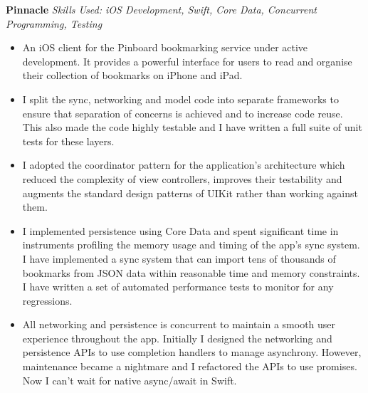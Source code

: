 \textbf{Pinnacle}  \newline
\textit{Skills Used: iOS Development, Swift, Core Data, Concurrent Programming, Testing}
%
\begin{itemize}[leftmargin=0mm]
\item An iOS client for the Pinboard bookmarking service under active
  development. It provides a powerful interface for users to read and organise
  their collection of bookmarks on iPhone and iPad.
\item I split the sync, networking and model code into separate frameworks to
  ensure that separation of concerns is achieved and to increase code
  reuse. This also made the code highly testable and I have written a full suite
  of unit tests for these layers.
\item I adopted the coordinator pattern for the application's architecture which
  reduced the complexity of view controllers, improves their testability and
  augments the standard design patterns of UIKit rather than working against
  them.
\item I implemented persistence using Core Data and spent significant time in
  instruments profiling the memory usage and timing of the app's sync system. I
  have implemented a sync system that can import tens of thousands of bookmarks
  from JSON data within reasonable time and memory constraints. I have written a
  set of automated performance tests to monitor for any regressions.
\item All networking and persistence is concurrent to maintain a smooth user
  experience throughout the app. Initially I designed the networking and
  persistence APIs to use completion handlers to manage asynchrony. However,
  maintenance became a nightmare and I refactored the APIs to use promises. Now
  I can't wait for native async/await in Swift.
\end{itemize}

